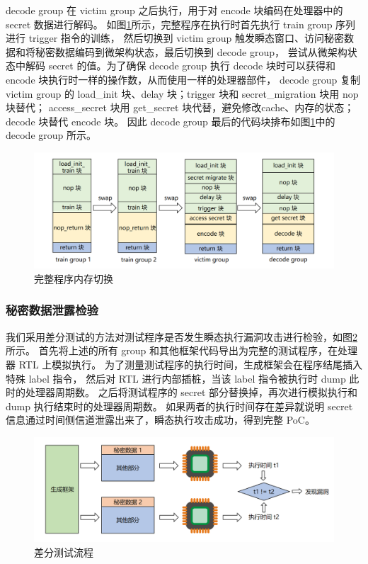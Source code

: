 decode group 在 victim group 之后执行，用于对 encode 块编码在处理器中的 secret 数据进行解码。
如图\ref{paper:group-switch-all}所示，完整程序在执行时首先执行 train group 序列进行 trigger 指令的训练，
然后切换到 victim group 触发瞬态窗口、访问秘密数据和将秘密数据编码到微架构状态，最后切换到 decode group，
尝试从微架构状态中解码 secret 的值。为了确保 decode group 执行 decode 块时可以获得和 encode 块执行时一样的操作数，从而使用一样的处理器部件，
decode group 复制 victim group 的 load\_init 块、delay 块；trigger 块和 secret\_migration 块用 nop 块替代；
access\_secret 块用 get\_secret 块代替，避免修改cache、内存的状态；decode 块替代 encode 块。
因此 decode group 最后的代码块排布如图\ref{paper:group-switch-all}中的 decode group 所示。\par

\begin{figure}[!h]
    \centering
    \includegraphics[width=\linewidth]{figure/paper/group-switch-all.png}
    \caption{完整程序内存切换}
    \label{paper:group-switch-all}
\end{figure}

\subsubsection{秘密数据泄露检验}

我们采用差分测试的方法对测试程序是否发生瞬态执行漏洞攻击进行检验，如图\ref{paper:differential-test}所示。
首先将上述的所有 group 和其他框架代码导出为完整的测试程序，在处理器 RTL 上模拟执行。
为了测量测试程序的执行时间，生成框架会在程序结尾插入特殊 label 指令，
然后对 RTL 进行内部插桩，当该 label 指令被执行时 dump 此时的处理器周期数。
之后将测试程序的 secret 部分替换掉，再次进行模拟执行和 dump 执行结束时的处理器周期数。
如果两者的执行时间存在差异就说明 secret 信息通过时间侧信道泄露出来了，瞬态执行攻击成功，得到完整 PoC。

\begin{figure}[!h]
    \centering
    \includegraphics[width=\linewidth]{figure/paper/differential-test.png}
    \caption{差分测试流程}
    \label{paper:differential-test}
\end{figure}

